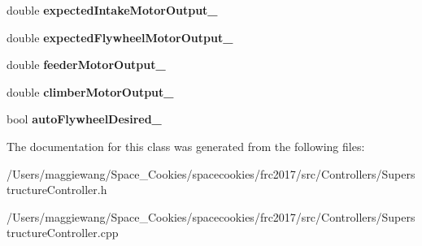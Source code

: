 \begin{DoxyCompactItemize}
double {\bfseries expected\+Intake\+Motor\+Output\+\_\+}
\item 
\mbox{\label{class_superstructure_controller_af65a138be4b54b771bd8d0a920d4cfed}} 
double {\bfseries expected\+Flywheel\+Motor\+Output\+\_\+}
\item 
\mbox{\label{class_superstructure_controller_a6ab9b46dca3b35ea49ee93e27754e380}} 
double {\bfseries feeder\+Motor\+Output\+\_\+}
\item 
\mbox{\label{class_superstructure_controller_aee34737a08e7f6c0fa006adfd53e1300}} 
double {\bfseries climber\+Motor\+Output\+\_\+}
\item 
\mbox{\label{class_superstructure_controller_ad0a8a6feea0dba27c419f6084ce7937a}} 
bool {\bfseries auto\+Flywheel\+Desired\+\_\+}
\end{DoxyCompactItemize}


The documentation for this class was generated from the following files\+:\begin{DoxyCompactItemize}
\item 
/\+Users/maggiewang/\+Space\+\_\+\+Cookies/spacecookies/frc2017/src/\+Controllers/Superstructure\+Controller.\+h\item 
/\+Users/maggiewang/\+Space\+\_\+\+Cookies/spacecookies/frc2017/src/\+Controllers/Superstructure\+Controller.\+cpp\end{DoxyCompactItemize}
